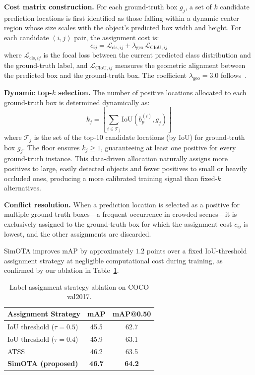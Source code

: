 \textbf{Cost matrix construction.}  For each ground-truth box
$g_j$, a set of $k$ candidate prediction locations is first
identified as those falling within a dynamic center region
whose size scales with the object's predicted box width and
height.  For each candidate $(i,j)$ pair, the assignment cost
is:
\begin{equation}
    c_{ij} = \mathcal{L}_{\text{cls},ij}
            + \lambda_{\text{geo}}\,\mathcal{L}_{\text{CIoU},ij}
    \label{eq:simota_cost}
\end{equation}
where $\mathcal{L}_{\text{cls},ij}$ is the focal loss between
the current predicted class distribution and the ground-truth
label, and $\mathcal{L}_{\text{CIoU},ij}$ measures the
geometric alignment between the predicted box and the
ground-truth box.  The coefficient $\lambda_{\text{geo}} = 3.0$
follows~\cite{ge2021yolox}.

\textbf{Dynamic top-$k$ selection.}  The number of positive
locations allocated to each ground-truth box is determined
dynamically as:
\begin{equation}
    k_j = \left\lfloor
        \sum_{i \in \mathcal{T}_j}
        \text{IoU}(b_p^{(i)}, g_j)
    \right\rfloor
    \label{eq:topk}
\end{equation}
where $\mathcal{T}_j$ is the set of the top-10 candidate
locations (by IoU) for ground-truth box $g_j$.  The floor
ensures $k_j \geq 1$, guaranteeing at least one positive for
every ground-truth instance.  This data-driven allocation
naturally assigns more positives to large, easily detected
objects and fewer positives to small or heavily occluded ones,
producing a more calibrated training signal than fixed-$k$
alternatives.

\textbf{Conflict resolution.}  When a prediction location is
selected as a positive for multiple ground-truth boxes---a
frequent occurrence in crowded scenes---it is exclusively
assigned to the ground-truth box for which the assignment cost
$c_{ij}$ is lowest, and the other assignments are discarded.

SimOTA improves mAP by approximately $1.2$ points over a fixed
IoU-threshold assignment strategy at negligible computational
cost during training, as confirmed by our ablation in
Table~\ref{tab:assignment_ablation}.

\begin{table}[!t]
\centering
\caption{Label assignment strategy ablation on COCO val2017.}
\label{tab:assignment_ablation}
\renewcommand{\arraystretch}{1.15}
\setlength{\tabcolsep}{4pt}
\begin{tabular}{l c c}
\hline\hline
\textbf{Assignment Strategy} & \textbf{mAP} & \textbf{mAP@0.50} \\
\hline
IoU threshold ($\tau = 0.5$)  & 45.5 & 62.7 \\
IoU threshold ($\tau = 0.4$)  & 45.9 & 63.1 \\
ATSS                          & 46.2 & 63.5 \\
\textbf{SimOTA (proposed)}    & \textbf{46.7} & \textbf{64.2} \\
\hline\hline
\end{tabular}
\end{table}

